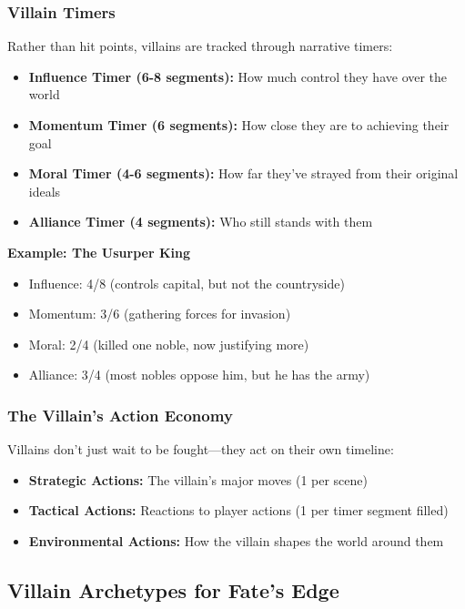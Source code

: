 \documentclass[10pt]{article}
\begin{document}
\subsubsection{Villain Timers}

Rather than hit points, villains are tracked through narrative timers:

\begin{itemize}
  \item \textbf{Influence Timer (6-8 segments):} How much control they have over the world
  \item \textbf{Momentum Timer (6 segments):} How close they are to achieving their goal
  \item \textbf{Moral Timer (4-6 segments):} How far they've strayed from their original ideals
  \item \textbf{Alliance Timer (4 segments):} Who still stands with them
\end{itemize}

\textbf{Example: The Usurper King}
\begin{itemize}
  \item Influence: 4/8 (controls capital, but not the countryside)
  \item Momentum: 3/6 (gathering forces for invasion)
  \item Moral: 2/4 (killed one noble, now justifying more)
  \item Alliance: 3/4 (most nobles oppose him, but he has the army)
\end{itemize}

\subsubsection{The Villain's Action Economy}

Villains don't just wait to be fought---they act on their own timeline:

\begin{itemize}
  \item \textbf{Strategic Actions:} The villain's major moves (1 per scene)
  \item \textbf{Tactical Actions:} Reactions to player actions (1 per timer segment filled)
  \item \textbf{Environmental Actions:} How the villain shapes the world around them
\end{itemize}

\subsection{Villain Archetypes for Fate's Edge}
\end{document}
